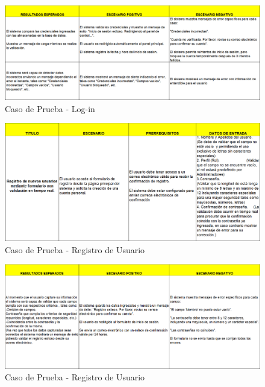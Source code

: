 \documentclass[12pt,letterpaper,spanish, xcolor=table]{report}
\numberwithin{figure}{subsection}
\begin{document}
	\begin{figure}[H]
		\centering
		\includegraphics[width=1.0\textwidth]
		{Imagenes/PathAyuda/CPLogin2.png}
		\caption{Caso de Prueba - Log-in 
		}\label{a2}
	\end{figure}

	\begin{figure}[H]
		\centering
		\includegraphics[width=1.0\textwidth]
		{Imagenes/PathAyuda/CPRegistroUsuario.png}
		\caption{Caso de Prueba - Registro de Usuario 
		}\label{a2}
	\end{figure}
	
	\begin{figure}[H]
		\centering
		\includegraphics[width=1.0\textwidth]
		{Imagenes/PathAyuda/CPRegistroUsuario2.png}
		\caption{Caso de Prueba - Registro de Usuario
		}\label{a2}
	\end{figure}
	
\end{document}
